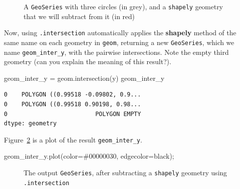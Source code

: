 \documentclass[
  letterpaper,
]{krantz}
\newenvironment{Shaded}{\begin{snugshade}}{\end{snugshade}}
\newcommand{\NormalTok}[1]{\textcolor[rgb]{0.00,0.23,0.31}{#1}}
\newcommand{\OperatorTok}[1]{\textcolor[rgb]{0.37,0.37,0.37}{#1}}
\newcommand{\StringTok}[1]{\textcolor[rgb]{0.13,0.47,0.30}{#1}}
\begin{document}
\begin{figure}[H]


\caption{\label{fig-geom-intersection}A \texttt{GeoSeries} with three
circles (in grey), and a \texttt{shapely} geometry that we will subtract
from it (in red)}

\end{figure}%

Now, using \texttt{.intersection} automatically applies the
\textbf{shapely} method of the same name on each geometry in
\texttt{geom}, returning a new \texttt{GeoSeries}, which we name
\texttt{geom\_inter\_y}, with the pairwise intersections. Note the empty
third geometry (can you explain the meaning of this result?).

\begin{Shaded}
\begin{Highlighting}[]
\NormalTok{geom\_inter\_y }\OperatorTok{=}\NormalTok{ geom.intersection(y)}
\NormalTok{geom\_inter\_y}
\end{Highlighting}
\end{Shaded}

\begin{verbatim}
0    POLYGON ((0.99518 -0.09802, 0.9...
0    POLYGON ((0.99518 0.90198, 0.98...
0                         POLYGON EMPTY
dtype: geometry
\end{verbatim}

Figure~\ref{fig-geom-intersection2} is a plot of the result
\texttt{geom\_inter\_y}.

\begin{Shaded}
\begin{Highlighting}[]
\NormalTok{geom\_inter\_y.plot(color}\OperatorTok{=}\StringTok{\textquotesingle{}\#00000030\textquotesingle{}}\NormalTok{, edgecolor}\OperatorTok{=}\StringTok{\textquotesingle{}black\textquotesingle{}}\NormalTok{)}\OperatorTok{;}
\end{Highlighting}
\end{Shaded}

\begin{figure}[H]


\caption{\label{fig-geom-intersection2}The output \texttt{GeoSeries},
after subtracting a \texttt{shapely} geometry using
\texttt{.intersection}}

\end{figure}%
\end{document}
